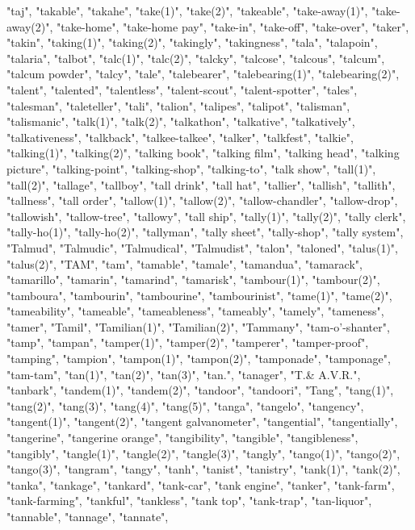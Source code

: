 "taj",
"takable",
"takahe",
"take(1)",
"take(2)",
"takeable",
"take-away(1)",
"take-away(2)",
"take-home",
"take-home pay",
"take-in",
"take-off",
"take-over",
"taker",
"takin",
"taking(1)",
"taking(2)",
"takingly",
"takingness",
"tala",
"talapoin",
"talaria",
"talbot",
"talc(1)",
"talc(2)",
"talcky",
"talcose",
"talcous",
"talcum",
"talcum powder",
"talcy",
"tale",
"talebearer",
"talebearing(1)",
"talebearing(2)",
"talent",
"talented",
"talentless",
"talent-scout",
"talent-spotter",
"tales",
"talesman",
"taleteller",
"tali",
"talion",
"talipes",
"talipot",
"talisman",
"talismanic",
"talk(1)",
"talk(2)",
"talkathon",
"talkative",
"talkatively",
"talkativeness",
"talkback",
"talkee-talkee",
"talker",
"talkfest",
"talkie",
"talking(1)",
"talking(2)",
"talking book",
"talking film",
"talking head",
"talking picture",
"talking-point",
"talking-shop",
"talking-to",
"talk show",
"tall(1)",
"tall(2)",
"tallage",
"tallboy",
"tall drink",
"tall hat",
"tallier",
"tallish",
"tallith",
"tallness",
"tall order",
"tallow(1)",
"tallow(2)",
"tallow-chandler",
"tallow-drop",
"tallowish",
"tallow-tree",
"tallowy",
"tall ship",
"tally(1)",
"tally(2)",
"tally clerk",
"tally-ho(1)",
"tally-ho(2)",
"tallyman",
"tally sheet",
"tally-shop",
"tally system",
"Talmud",
"Talmudic",
"Talmudical",
"Talmudist",
"talon",
"taloned",
"talus(1)",
"talus(2)",
"TAM",
"tam",
"tamable",
"tamale",
"tamandua",
"tamarack",
"tamarillo",
"tamarin",
"tamarind",
"tamarisk",
"tambour(1)",
"tambour(2)",
"tamboura",
"tambourin",
"tambourine",
"tambourinist",
"tame(1)",
"tame(2)",
"tameability",
"tameable",
"tameableness",
"tameably",
"tamely",
"tameness",
"tamer",
"Tamil",
"Tamilian(1)",
"Tamilian(2)",
"Tammany",
"tam-o'-shanter",
"tamp",
"tampan",
"tamper(1)",
"tamper(2)",
"tamperer",
"tamper-proof",
"tamping",
"tampion",
"tampon(1)",
"tampon(2)",
"tamponade",
"tamponage",
"tam-tam",
"tan(1)",
"tan(2)",
"tan(3)",
"tan.",
"tanager",
"T.\& A.V.R.",
"tanbark",
"tandem(1)",
"tandem(2)",
"tandoor",
"tandoori",
"Tang",
"tang(1)",
"tang(2)",
"tang(3)",
"tang(4)",
"tang(5)",
"tanga",
"tangelo",
"tangency",
"tangent(1)",
"tangent(2)",
"tangent galvanometer",
"tangential",
"tangentially",
"tangerine",
"tangerine orange",
"tangibility",
"tangible",
"tangibleness",
"tangibly",
"tangle(1)",
"tangle(2)",
"tangle(3)",
"tangly",
"tango(1)",
"tango(2)",
"tango(3)",
"tangram",
"tangy",
"tanh",
"tanist",
"tanistry",
"tank(1)",
"tank(2)",
"tanka",
"tankage",
"tankard",
"tank-car",
"tank engine",
"tanker",
"tank-farm",
"tank-farming",
"tankful",
"tankless",
"tank top",
"tank-trap",
"tan-liquor",
"tannable",
"tannage",
"tannate",

